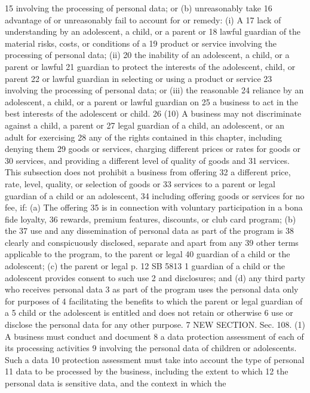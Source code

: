 15 involving the processing of personal data; or (b) unreasonably take
16 advantage of or unreasonably fail to account for or remedy: (i) A
17 lack of understanding by an adolescent, a child, or a parent or
18 lawful guardian of the material risks, costs, or conditions of a
19 product or service involving the processing of personal data; (ii)
20 the inability of an adolescent, a child, or a parent or lawful
21 guardian to protect the interests of the adolescent, child, or parent
22 or lawful guardian in selecting or using a product or service
23 involving the processing of personal data; or (iii) the reasonable
24 reliance by an adolescent, a child, or a parent or lawful guardian on
25 a business to act in the best interests of the adolescent or child.
26 (10) A business may not discriminate against a child, a parent or
27 legal guardian of a child, an adolescent, or an adult for exercising
28 any of the rights contained in this chapter, including denying them
29 goods or services, charging different prices or rates for goods or
30 services, and providing a different level of quality of goods and
31 services. This subsection does not prohibit a business from offering
32 a different price, rate, level, quality, or selection of goods or
33 services to a parent or legal guardian of a child or an adolescent,
34 including offering goods or services for no fee, if: (a) The offering
35 is in connection with voluntary participation in a bona fide loyalty,
36 rewards, premium features, discounts, or club card program; (b) the
37 use and any dissemination of personal data as part of the program is
38 clearly and conspicuously disclosed, separate and apart from any
39 other terms applicable to the program, to the parent or legal
40 guardian of a child or the adolescent; (c) the parent or legal
p. 12 SB 5813
1 guardian of a child or the adolescent provides consent to such use
2 and disclosures; and (d) any third party who receives personal data
3 as part of the program uses the personal data only for purposes of
4 facilitating the benefits to which the parent or legal guardian of a
5 child or the adolescent is entitled and does not retain or otherwise
6 use or disclose the personal data for any other purpose.
7 NEW SECTION. Sec. 108. (1) A business must conduct and document
8 a data protection assessment of each of its processing activities
9 involving the personal data of children or adolescents. Such a data
10 protection assessment must take into account the type of personal
11 data to be processed by the business, including the extent to which
12 the personal data is sensitive data, and the context in which the
